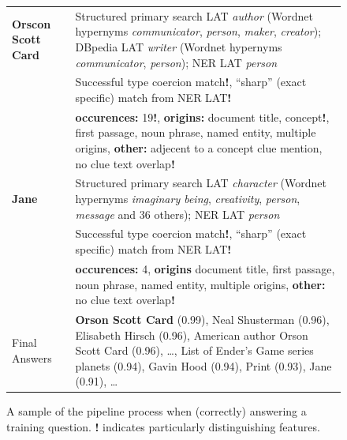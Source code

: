 \begin{figure}[t!]
\begin{tabular}{|p{1.8cm}p{6cm}|}
\textbf{Orscon Scott Card} & Structured primary search LAT \textit{author} (Wordnet hypernyms \textit{communicator}, \textit{person}, \textit{maker}, \textit{creator}); DBpedia LAT \textit{writer} (Wordnet hypernyms \textit{communicator}, \textit{person}); NER LAT \textit{person} \\
	& Successful type coercion match\textbf{!}, ``sharp'' (exact specific) match from NER LAT\textbf{!} \\
	& \textbf{occurences:} 19\textbf{!}, \textbf{origins:} document title, concept\textbf{!}, first passage, noun phrase, named entity, multiple origins, \textbf{other:} adjecent to a concept clue mention, no clue text overlap\textbf{!} \\
\textbf{Jane} & Structured primary search LAT \textit{character} (Wordnet hypernyms \textit{imaginary being}, \textit{creativity}, \textit{person}, \textit{message} and 36 others); NER LAT \textit{person} \\
	& Successful type coercion match\textbf{!}, ``sharp'' (exact specific) match from NER LAT\textbf{!} \\
	& \textbf{occurences:} 4, \textbf{origins} document title, first passage, noun phrase, named entity, multiple origins,
	\textbf{other:} no clue text overlap\textbf{!} \\ \hline

Final Answers & \textbf{Orson Scott Card} (0.99), Neal Shusterman (0.96), Elisabeth Hirsch (0.96), American author Orson Scott Card (0.96), \dots, List of Ender's Game series planets (0.94), Gavin Hood (0.94), Print (0.93), Jane (0.91), \dots \\ \hline
\end{tabular}
\vspace*{-0.2cm}
\caption{A sample of the pipeline process when (correctly) answering a training question. \textbf{!} indicates particularly distinguishing features.}
\label{fig:exEnder}
\end{figure}

